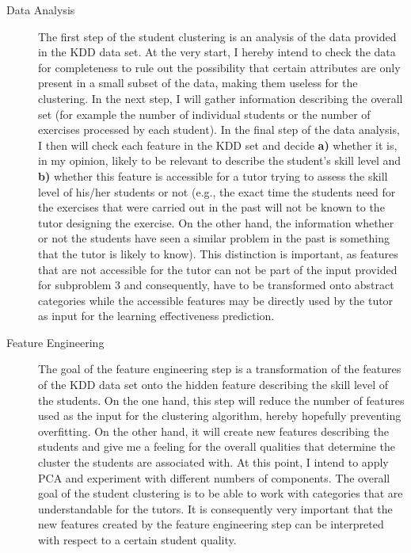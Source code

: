 \begin{description}
	\item[Data Analysis] The first step of the student clustering is an analysis of the data provided in the KDD data set. At the very start, I hereby intend to check the data for completeness to rule out the possibility that certain attributes are only present in a small subset of the data, making them useless for the clustering. In the next step, I will gather information describing the overall set (for example the number of individual students or the number of exercises processed by each student). In the final step of the data analysis, I then will check each feature in the KDD set and decide \textbf{a)} whether it is, in my opinion, likely to be relevant to describe the student’s skill level and \textbf{b)} whether this feature is accessible for a tutor trying to assess the skill level of his/her students or not (e.g., the exact time the students need for the exercises that were carried out in the past will not be known to the tutor designing the exercise. On the other hand, the information whether or not the students have seen a  similar problem in the past is something that the tutor is likely to know). This distinction is important, as features that are not accessible for the tutor can not be part of the input provided for subproblem 3 and consequently, have to be transformed onto abstract categories while the accessible features may be directly used by the tutor as input for the learning effectiveness prediction.
	
	\item[Feature Engineering] The goal of the feature engineering step is a transformation of the features of the KDD data set onto the hidden feature describing the skill level of the students. On the one hand, this step will reduce the number of features used as the input for the clustering algorithm, hereby hopefully preventing overfitting. On the other hand, it will create new features describing the students and give me a feeling for the overall qualities that determine the cluster the students are associated with. At this point, I intend to apply PCA and experiment with different numbers of components. The overall goal of the student clustering is to be able to work with categories that are understandable for the tutors. It is consequently very important that the new features created by the feature engineering step can be interpreted with respect to a certain student quality.
	

\end{description}
